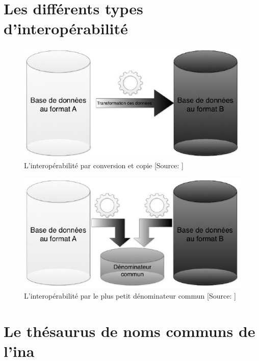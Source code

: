 \chapter{\label{annexe_types_interop}Les différents types d'interopérabilité}

\begin{figure}[!h]
	\centering
	\includegraphics[width=12cm]{images/interop_conversion_copie.jpeg}
	\medskip
	\caption[L'interopérabilité par conversion et copie]{L'interopérabilité par conversion et copie [Source: \cite{bermes_2_2013}]}
\end{figure}

\begin{figure}[!h]
	\centering
	\includegraphics[width=12cm]{images/interop_denom_commun.jpeg}
	\medskip
	\caption[L'interopérabilité par le plus petit dénominateur commun]{L'interopérabilité par le plus petit dénominateur commun [Source: \cite{bermes_2_2013}]}
\end{figure}

\chapter{\label{annexe_thesaurus}Le thésaurus de noms communs de l'\ac{ina}}

